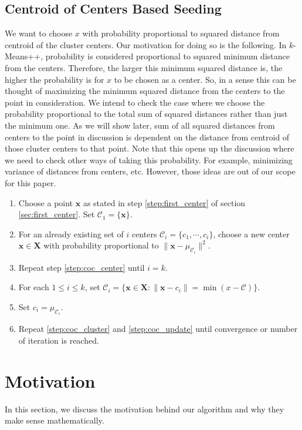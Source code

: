 \documentclass[twoside, 11pt]{article}
\newcommand{\x}{\mathbf{x}}
\newcommand{\X}{\mathbf{X}}
\newcommand{\C}{\mathcal{C}}
\begin{document}
	\subsection{Centroid of Centers Based Seeding}
	We want to choose $x$ with probability proportional to squared distance from centroid of the cluster centers. Our motivation for doing so is the following. In $k$-Means++, probability is considered proportional to squared minimum distance from the centers. Therefore, the larger this minimum squared distance is, the higher the probability is for $x$ to be chosen as a center. So, in a sense this can be thought of maximizing the minimum squared distance from the centers to the point in consideration. We intend to check the case where we choose the probability proportional to the total sum of squared distances rather than just the minimum one. As we will show later, sum of all squared distances from centers to the point in discussion is dependent on the distance from centroid of those cluster centers to that point. Note that this opens up the discussion where we need to check other ways of taking this probability. For example, minimizing variance of distances from centers, etc. However, those ideas are out of our scope for this paper.
		\begin{enumerate}[i]
			\item Choose a point $\x$ as stated in step \eqref{step:first_center} of section \eqref{sec:first_center}. Set $\C_1=\{\x\}$.
			\item For an already existing set of $i$ centers $\mathcal{C}_i=\{c_1,\cdots,c_i\}$, choose a new center $\x\in\X$ with probability proportional to $\|\x-\mu_{\C_i}\|^2$.\label{step:coc_center}
			\item Repeat step \eqref{step:coc_center} until $i=k$.
			\item For each $1\leq i\leq k$, set $\C_i=\{\x\in\X:\|\x-c_i\|=\min(x-\C)\}$.\label{step:coc_cluster}
			\item Set $c_i=\mu_{\C_i}$.\label{step:coc_update}
			\item Repeat \eqref{step:coc_cluster} and \eqref{step:coc_update} until convergence or number of iteration is reached.
		\end{enumerate}
	\section{Motivation}
	In this section, we discuss the motivation behind our algorithm and why they make sense mathematically. 
\end{document}
